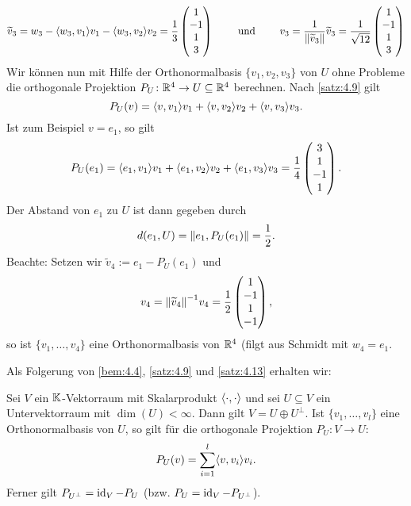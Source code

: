 \begin{beispiel}
\begin{enumerate}[(i)]
\[		\]
		\[
			\widetilde{v}_3 = w_3 - \sk{w_3,v_1} v_1 - \sk{w_3,v_2} v_2 = \frac{1}{3}\begin{pmatrix} 1 \\ -1 \\ 1 \\ 3 \end{pmatrix} \qquad \text{ und } \qquad 
			v_3 = \frac{1}{\no{\widetilde{v}_3}} \widetilde{v}_3 = \frac{1}{\sqrt{12}} \begin{pmatrix} 1 \\ -1 \\ 1 \\ 3 \end{pmatrix}
		\]
		Wir können nun mit Hilfe der Orthonormalbasis $\{v_1,v_2,v_3\}$ von $U$ ohne Probleme die orthogonale Projektion $P_U\colon \mathbb{R}^4 \rightarrow U \subseteq \mathbb{R}^4$ berechnen.
		Nach \autoref{satz:4.9} gilt
		\[
			P_U(v) = \sk{v,v_1} v_1 + \sk{v,v_2} v_2 + \sk{v,v_3} v_3.
		\]
		Ist zum Beispiel $v = e_1$, so gilt
		\[
			P_U(e_1) = \sk{e_1,v_1} v_1 + \sk{e_1,v_2} v_2 + \sk{e_1,v_3} v_3 =
			\frac{1}{4} \begin{pmatrix} 3 \\ 1 \\ -1 \\ 1 \end{pmatrix}.
		\]
		Der Abstand von $e_1$ zu $U$ ist dann gegeben durch
		\[
			d(e_1,U) = \left\lVert e_1,P_U(e_1)\right\rVert = \frac{1}{2}.
		\]
		Beachte: Setzen wir $\widetilde{v}_4 := e_1 - P_U(e_1)$ und
		\[
			v_4 = \no{\widetilde{v}_4}^{-1} v_4 = \frac{1}{2} \begin{pmatrix}
			1 \\ -1 \\ 1 \\ -1
			\end{pmatrix},
		\]
		so ist $\{v_1,\dots,v_4\}$ eine Orthonormalbasis von $\mathbb{R}^4$ (filgt aus Schmidt mit $w_4 = e_1$.
	\end{enumerate}
\end{beispiel}

Als Folgerung von \autoref{bem:4.4}, \autoref{satz:4.9} und \autoref{satz:4.13} erhalten wir:
\begin{satz}
	\label{satz:4.16}
	Sei $V$ ein $\mathbb{K}$-Vektorraum mit Skalarprodukt $\left\langle\cdot,\cdot\right\rangle$ und sei $U \subseteq V$ ein Untervektorraum mit $\dim(U) < \infty$.
	Dann gilt $V = U \oplus U^\perp$.
	Ist $\{v_1,\dots,v_l\}$ eine Orthonormalbasis von $U$, so gilt für die orthogonale Projektion $P_U \colon V \rightarrow U$:
	\[
		P_U(v) = \sum\limits_{i=1}^{l} \sk{v,v_i} v_i.
	\]
	Ferner gilt $P_{U^\perp} = \operatorname{id}_V - P_U$ (bzw. $P_U = \operatorname{id}_V - P_{U^\perp}$).
\end{satz}

